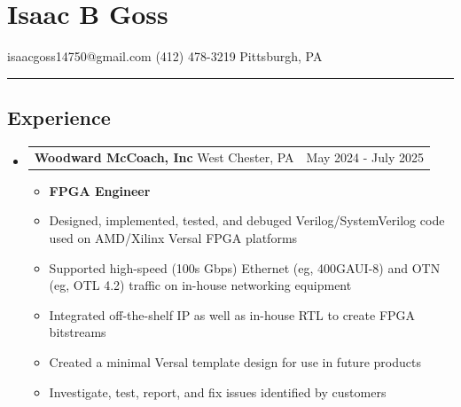 \documentclass[20pt]{article}
\makeatletter
\providecommand{\tightlist}{
    \setlength{\itemsep}{0pt}\setlength{\parskip}{0pt}
}
\providecommand{\datetable}[2]{
    \begin{tabular*}{\textwidth}{@{}r @{\extracolsep{\fill}} l}
        #1 & #2
    \end{tabular*}
}
\makeatother
\begin{document}
    \section*{Isaac B Goss}\label{isaac-b-goss}
    isaacgoss14750@gmail.com \textbar{} (412) 478-3219 \textbar{} Pittsburgh, PA
    
    \hrule

    \subsection*{Experience}\label{experience}
    \begin{itemize}[label={}]


        \item \datetable{
            \textbf{Woodward McCoach, Inc} \textbar{} West Chester, PA
        }{May 2024 - July 2025}
        \begin{itemize}[topsep=0pt]\tightlist
            \item \textbf{FPGA Engineer}
            \item Designed, implemented, tested, and debuged Verilog/SystemVerilog code used on AMD/Xilinx Versal FPGA platforms
            \item Supported high-speed (100s Gbps) Ethernet (eg, 400GAUI-8) and OTN (eg, OTL 4.2) traffic on in-house networking equipment
            \item Integrated off-the-shelf IP as well as in-house RTL to create FPGA bitstreams
            \item Created a minimal Versal template design for use in future products
            \item Investigate, test, report, and fix issues identified by customers


\end{itemize}
\end{itemize}
\end{document}
